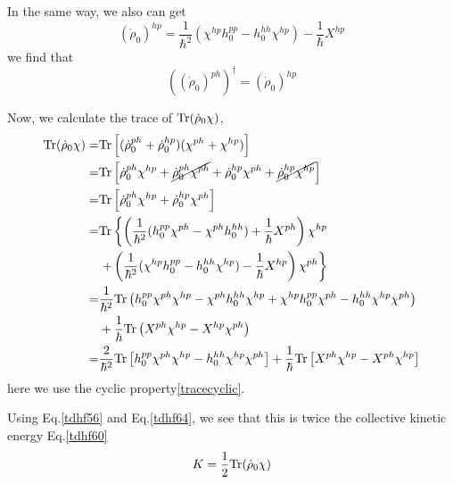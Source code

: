   In the same way, we also can get
  \begin{equation}
    (\dot{\rho}_0)^{hp} = \frac{1}{\hbar^2}(\chi^{hp}h_0^{pp} - h_0^{hh}\chi^{hp}) - \frac{1}{\hbar}X^{hp} \label{tdhf67}
  \end{equation}
  we find that
  \begin{equation}
    \left((\dot{\rho}_0)^{ph}\right)^\dagger = (\dot{\rho}_0)^{hp} \label{tdhf68}
  \end{equation}

  Now, we calculate the trace of ${\rm Tr}(\dot{\rho}_0\chi)$,
  \begin{equation}
    \begin{aligned}
      {\rm Tr}(\dot{\rho}_0\chi) =& {\rm Tr}\left[(\dot{\rho}_0^{ph} + \dot{\rho}^{hp}_{0})(\chi^{ph} + \chi^{hp})\right]\\
      =& {\rm Tr}\left[\dot{\rho}_0^{ph}\chi^{hp} + \cancel{\dot{\rho}^{ph}_{0}\chi^{ph}} + \dot{\rho}_0^{hp}\chi^{ph} + \cancel{\dot{\rho}^{hp}_{0}\chi^{hp}} \right]\\
      =& {\rm Tr}\left[\dot{\rho}_0^{ph}\chi^{hp} + \dot{\rho}_0^{hp}\chi^{ph}\right]\\  \label{tdhf69}
      =& {\rm Tr}\left\{ \left(\frac{1}{\hbar^2}(h_0^{pp}\chi^{ph} - \chi^{ph}h_0^{hh}) + \frac{1}{\hbar}X^{ph}\right)\chi^{hp} \right.\\
       & \left. + \left( \frac{1}{\hbar^2} ( \chi^{hp}h_0^{pp} - h_0^{hh}\chi^{hp} ) - \frac{1}{\hbar} X^{hp} \right) \chi^{ph} \right\} \\
      =& \frac{1}{\hbar^2} {\rm Tr} \left( h_0^{pp}\chi^{ph}\chi^{hp} - \chi^{ph}h_0^{hh}\chi^{hp} + \chi^{hp}h_0^{pp}\chi^{ph} - h_0^{hh}\chi^{hp}\chi^{ph} \right)\\
       & + \frac{1}{\hbar} {\rm Tr}\left( X^{ph}\chi^{hp} - X^{hp}\chi^{ph} \right) \\
      =& \frac{2}{\hbar^2}{\rm Tr}\left[h_0^{pp}\chi^{ph}\chi^{hp} - h_0^{hh}\chi^{hp}\chi^{ph} \right] + \frac{1}{\hbar}{\rm Tr}\left[ X^{ph}\chi^{hp} - X^{ph}\chi^{hp} \right]
    \end{aligned}
  \end{equation}
  here we use the cyclic property\eqref{tracecyclic}.

  Using Eq.\eqref{tdhf56} and Eq.\eqref{tdhf64}, we see that this is twice the collective kinetic energy Eq.\eqref{tdhf60}
  \begin{equation}
    K = \frac{1}{2}{\rm Tr}(\dot{\rho}_0\chi) \label{tdhf70}
  \end{equation}


